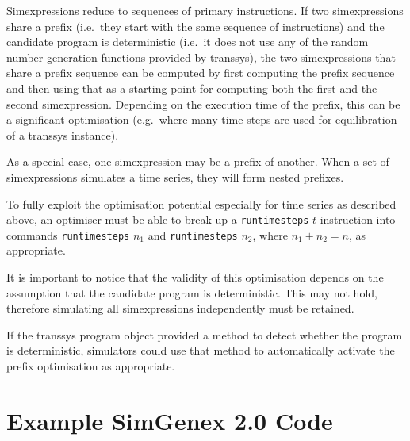 \documentclass[a4paper,fleqn]{article}
\newcommand{\computercode}[1]{\texttt{#1}}
\begin{document}
Simexpressions reduce to sequences of primary instructions. If two
simexpressions share a prefix (i.e.\ they start with the same sequence
of instructions) and the candidate program is deterministic (i.e.\ it
does not use any of the random number generation functions provided by
transsys), the two simexpressions that share a prefix sequence can be
computed by first computing the prefix sequence and then using that as
a starting point for computing both the first and the second
simexpression. Depending on the execution time of the prefix, this can
be a significant optimisation (e.g.\ where many time steps are used
for equilibration of a transsys instance).

As a special case, one simexpression may be a prefix of another.
When a set of simexpressions simulates a time series, they will form
nested prefixes.

To fully exploit the optimisation potential especially for time series
as described above, an optimiser must be able to break up a
\computercode{runtimesteps} $t$ instruction into commands
\computercode{runtimesteps} $n_1$ and \computercode{runtimesteps}
$n_2$, where $n_1 + n_2 = n$, as appropriate.

It is important to notice that the validity of this optimisation
depends on the assumption that the candidate program is
deterministic. This may not hold, therefore simulating all
simexpressions independently must be retained.

If the transsys program object provided a method to detect whether
the program is deterministic, simulators could use that method to
automatically activate the prefix optimisation as appropriate.


\section{Example SimGenex 2.0 Code}
\end{document}
